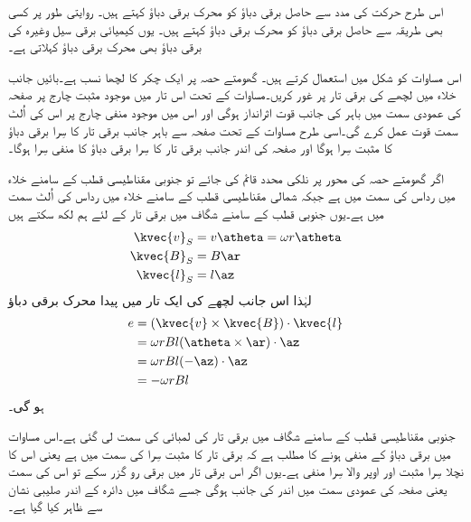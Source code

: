 اس طرح حرکت کی مدد سے حاصل برقی دباؤ کو محرک برقی دباؤ  کہتے ہیں۔ روایتی طور پر کسی بھی طریقہ سے حاصل برقی دباؤ کو محرک برقی دباؤ کہتے ہیں۔ یوں کیمیائی برقی سیل وغیرہ کی برقی دباؤ بھی محرک برقی دباؤ کہلاتی  ہے۔

اس مساوات کو شکل  میں استعمال کرتے ہیں۔ گھومتے حصہ پر ایک چکر کا لچھا نسب ہے۔بائیں جانب خلاء میں لچھے کی برقی تار پر غور کریں۔مساوات  کے تحت اس تار میں موجود مثبت چارج پر صفحہ کی عمودی سمت میں باہر کی جانب قوت اثرانداز ہوگی اور اس میں موجود منفی چارج پر اس کی اُلٹ سمت قوت عمل کرے گی۔اسی طرح مساوات  کے تحت صفحہ سے باہر جانب برقی تار کا سِرا برقی دباؤ   کا مثبت سِرا ہوگا اور صفحہ کی اندر جانب برقی تار کا سِرا برقی دباؤ  کا منفی سِرا ہوگا۔

اگر گھومتے حصہ کی محور پر نلکی محدد قائم کی جائے تو جنوبی مقناطیسی قطب کے سامنے خلاء میں  رداس کی سمت میں ہے جبکہ شمالی مقناطیسی قطب کے سامنے  خلاء میں   رداس کی اُلٹ سمت میں ہے۔یوں جنوبی قطب کے سامنے شگاف میں برقی تار   کے لئے ہم لکھ سکتے ہیں
\begin{gather}
\begin{aligned}
\kvec{v}_S&=v \atheta =\omega r \atheta\\
\kvec{B}_S&=B \ar\\
\kvec{l}_S&=l \az
\end{aligned}
\end{gather}
لہٰذا اس جانب لچھے کی ایک تار میں پیدا محرک برقی دباؤ
\begin{gather}
\begin{aligned}
e&=(\kvec{v} \times \kvec{B}) \cdot \kvec{l}\\
&=\omega r B l  (\atheta \times \ar) \cdot \az\\
&=\omega r B l  (-\az) \cdot \az\\
&=-\omega r B l 
\end{aligned}
\end{gather}
ہو گی۔

جنوبی مقناطیسی قطب کے سامنے شگاف میں برقی تار کی لمبائی کی سمت  لی گئی ہے۔اس مساوات میں برقی دباؤ کے منفی ہونے کا مطلب ہے کہ برقی تار کا مثبت سِرا  کی سمت میں ہے یعنی اس کا نچلا سِرا مثبت اور اوپر والا سِرا منفی ہے۔یوں اگر اس برقی تار میں برقی رو گزر سکے تو اس کی سمت  یعنی صفحہ کی عمودی سمت میں اندر کی جانب ہوگی جسے شگاف میں دائرہ کے اندر صلیبی نشان سے ظاہر کیا گیا ہے۔ 

